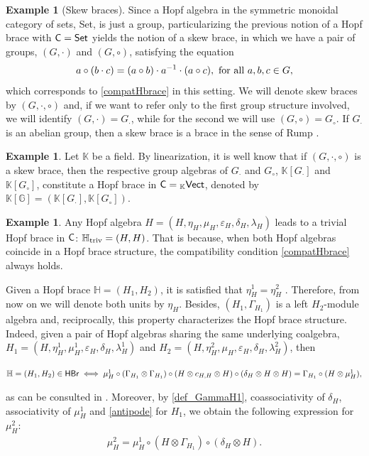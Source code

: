 \documentclass[11pt,reqno]{amsart}
\theoremstyle{plain}%
\theoremstyle{definition}
\newtheorem{example}[theorem]{Example}%
\theoremstyle{remark}
\begin{document}
\begin{example}[Skew braces]\label{skewbraces}
	Since a Hopf algebra in the symmetric monoidal category of sets, {\sf Set}, is just a group, particularizing the previous notion of a Hopf brace with ${\sf C}={\sf Set}$ yields the notion of a skew brace, in which we have a pair of groups, $(G,\cdot)$ and $(G,\circ)$, satisfying the equation 
	\[a\circ(b\cdot c)=(a\circ b)\cdot a^{-1}\cdot(a\circ c), \textnormal{ for all }a,b,c\in G,\]
	which corresponds to \eqref{compatHbrace} in this setting. We will denote skew braces by $(G,\cdot,\circ)$ and, if we want to refer only to the first group structure involved, we will identify $(G,\cdot)=G_{\cdot}$, while for the second we will use $(G,\circ)=G_{\circ}$.  If $G_{\cdot}$  is an abelian group, then a skew brace is a brace in the sense of Rump \cite{Rump}.
\end{example}
\begin{example}\label{galg}
Let $\mathbb{K}$ be a field. By linearization, it is well know that if $(G,\cdot,\circ)$ is a skew brace, then the respective group algebras of $G_{\cdot}$ and $G_{\circ}$, $\mathbb{K}[G_{\cdot}]$ and $\mathbb{K}[G_{\circ}]$, constitute a Hopf brace in ${\sf C}={}_{\mathbb{K}}{\sf Vect}$, denoted by $\mathbb{K}[\mathbb{G}]=(\mathbb{K}[G_{\cdot}],\mathbb{K}[G_{\circ}])$.
\end{example}
\begin{example}
	Any Hopf algebra $H=(H,\eta_{H},\mu_{H},\varepsilon_{H},\delta_{H},\lambda_{H})$ leads to a trivial Hopf brace in ${\sf C}$: $\mathbb{H}_{{\rm triv}}=(H,H)$. That is because, when both Hopf algebras coincide in a Hopf brace structure, the compatibility condition \eqref{compatHbrace} always holds.
\end{example}

Given a Hopf brace $\mathbb{H}=(H_{1},H_{2})$, it is satisfied that $\eta_{H}^{1}=\eta_{H}^{2}$ \cite[Remark 1.3]{AGV}. Therefore, from now on we will denote both units by $\eta_{H}$. Besides, $(H_{1},\Gamma_{H_{1}})$ is a left $H_{2}$-module algebra \cite[Lemma 1.8]{AGV} and, reciprocally, this property characterizes the Hopf brace structure. Indeed, given a pair of Hopf algebras sharing the same underlying coalgebra, $H_{1}=(H,\eta_{H}^{1},\mu_{H}^{1},\varepsilon_{H},\delta_{H},\lambda_{H}^{1})$ and $H_{2}=(H,\eta_{H}^{2},\mu_{H}^{},\varepsilon_{H},\delta_{H},\lambda_{H}^{2})$, then 
\begin{center}
	$\mathbb{H}=(H_{1},H_{2})\in{\sf HBr}\iff \mu_{H}^{1}\circ(\Gamma_{H_{1}}\otimes\Gamma_{H_{1}})\circ(H\otimes c_{H,H}\otimes H)\circ(\delta_{H}\otimes H\otimes H)=\Gamma_{H_{1}}\circ(H\otimes\mu_{H}^{1}),$
\end{center}
as can be consulted in \cite[Theorem 1.16]{RGONRAMOS}. Moreover, by \eqref{def_GammaH1}, coassociativity of $\delta_{H}$, associativity of $\mu_{H}^{1}$ and \eqref{antipode} for $H_{1}$, we obtain the following expression for $\mu_{H}^{2}$:
\begin{gather}\label{mu2-exp}
	\mu_{H}^{2}=\mu_{H}^{1}\circ(H\otimes \Gamma_{H_{1}})\circ(\delta_{H}\otimes H).
\end{gather}
\end{document}
